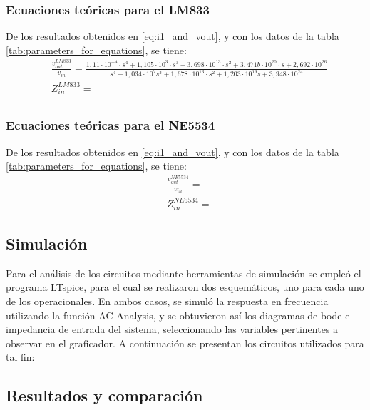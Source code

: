 \subsubsection{Ecuaciones teóricas para el LM833}
De los resultados obtenidos en \ref{eq:i1_and_vout}, y con los datos de la tabla \ref{tab:parameters_for_equations}, se tiene:
\begin{align}
    & \frac{v_{out}^{LM833}}{v_{in}} = \frac{1,11 \cdot 10^{-4} \cdot s^{4} + 1,105 \cdot 10^{3} \cdot s^{3} + 3,698 \cdot 10^{13} \cdot s^{2} + 3,471b\cdot 10^{20} \cdot s + 2,692 \cdot 10^{26}}
    {s^{4} + 1,034 \cdot 10^{7} s^{3} + 1,678 \cdot 10^{13} \cdot s^{2} + 1,203 \cdot 10^{19} s + 3,948 \cdot 10^{24}} \label{eq:LM833_transfer_fun} \\
    & Z_{in}^{LM833} = \label{eq:LM833_in_impedance} \\
\end{align}

\subsubsection{Ecuaciones teóricas para el NE5534}
De los resultados obtenidos en \ref{eq:i1_and_vout}, y con los datos de la tabla \ref{tab:parameters_for_equations}, se tiene:
\begin{align}
    & \frac{v_{out}^{NE5534}}{v_{in}} = \label{eq:NE5534_transfer_fun} \\
    & Z_{in}^{NE5534} = \label{eq:NE5534_in_impedance}
\end{align}


\subsection{Simulación}
Para el análisis de los circuitos mediante herramientas de simulación se empleó el programa LTspice, para el cual se realizaron dos esquemáticos, uno para cada uno de los operacionales.
En ambos casos, se simuló la respuesta en frecuencia utilizando la función AC Analysis, y se obtuvieron así los diagramas de bode e impedancia de entrada del sistema, seleccionando las variables pertinentes a observar en el graficador.
A continuación se presentan los circuitos utilizados para tal fin:

\subsection{Resultados y comparación}
